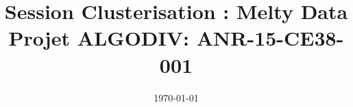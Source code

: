 \documentclass{beamer}
\title[Melty Clustering]{Session Clusterisation : Melty Data \\ {\small Projet ALGODIV: ANR-15-CE38-001}}
\institute[LIP6]{LIP6-UMPC, Sorbonne}
\date{\today}
\begin{document}
\begin{frame}
  \titlepage
\end{frame}


\end{document}
